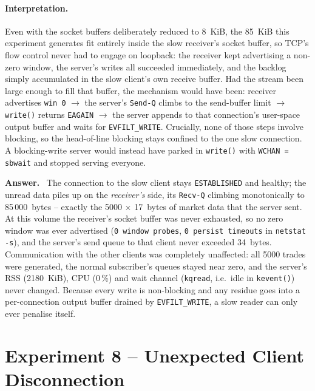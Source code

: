 \documentclass[11pt,a4paper]{article}
\newenvironment{answer}
  {\begin{answerbox}\textbf{\color{accent}Answer.}\ }
  {\end{answerbox}}
\begin{document}
\paragraph{Interpretation.}  Even with the socket buffers deliberately reduced to 8~KiB,
the 85~KiB this experiment generates fit entirely inside the slow receiver's socket
buffer, so TCP's flow control never had to engage on loopback: the receiver kept
advertising a non-zero window, the server's writes all succeeded immediately, and the
backlog simply accumulated in the slow client's own receive buffer.  Had the stream been large enough to fill that buffer, the mechanism would have
been: receiver advertises \texttt{win 0} $\rightarrow$ the server's \texttt{Send-Q}
climbs to the send-buffer limit $\rightarrow$ \texttt{write()} returns \texttt{EAGAIN}
$\rightarrow$ the server appends to that connection's user-space output buffer and waits
for \texttt{EVFILT\_WRITE}.  Crucially, none of those steps involve blocking, so the
head-of-line blocking stays confined to the one slow connection.  A blocking-write
server would instead have parked in \texttt{write()} with \texttt{WCHAN = sbwait} and
stopped serving everyone.

\begin{answer}
The connection to the slow client stays \texttt{ESTABLISHED} and healthy; the unread
data piles up on the \emph{receiver's} side, its \texttt{Recv-Q} climbing monotonically
to 85\,000~bytes -- exactly the 5000 $\times$ 17~bytes of market data that the server
sent.  At this volume the receiver's socket buffer was never exhausted, so no zero
window was ever advertised (\texttt{0 window probes}, \texttt{0 persist timeouts} in
\texttt{netstat -s}), and the server's send queue to that client never exceeded
34~bytes.  Communication with the other clients was completely unaffected: all 5000
trades were generated, the normal subscriber's queues stayed near zero, and the server's
RSS (2180~KiB), CPU (0\,\%) and wait channel (\texttt{kqread}, i.e.\ idle in
\texttt{kevent()}) never changed.  Because every write is non-blocking and any residue
goes into a per-connection output buffer drained by \texttt{EVFILT\_WRITE}, a slow
reader can only ever penalise itself.
\end{answer}

\section{Experiment 8 -- Unexpected Client Disconnection}
\end{document}
